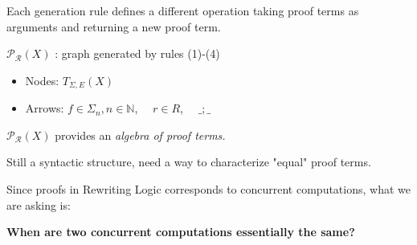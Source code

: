 \documentclass{beamer}
\begin{document}
\begin{frame}

\large 

Each generation rule defines a different operation taking proof terms as arguments and returning a new 
proof term.

\bigskip    
$\mathcal{P_R}(X)$ : graph generated by rules (1)-(4)

\begin{itemize}
    \item Nodes: $T_{\Sigma,E}(X)$
    \item Arrows: $f \in \Sigma_n,n \in \mathbb{N}$,$\quad$ $r \in R$,$\quad$ $\_;\_$
\end{itemize}

$\mathcal{P_R}(X)$ provides an \emph{algebra of proof terms.} 

\pause
\bigskip
Still a syntactic structure, need a way to characterize "equal" proof terms.

\bigskip
Since proofs in Rewriting Logic corresponds to concurrent computations, what we are asking is:
\begin{center}
    \textbf{When are two concurrent computations essentially the same?}
\end{center}
\end{frame}
\end{document}
